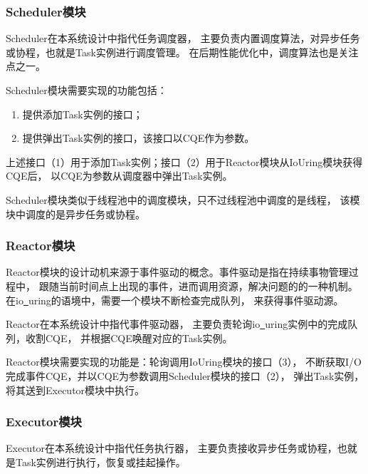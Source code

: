 \documentclass[supercite]{HustGraduPaper}
\theoremstyle{definition}
\begin{document}
\subsubsection{Scheduler模块}

Scheduler在本系统设计中指代任务调度器，
主要负责内置调度算法，对异步任务或协程，也就是Task实例进行调度管理。
在后期性能优化中，调度算法也是关注点之一。\par

Scheduler模块需要实现的功能包括：

\begin{enumerate}
  \item 提供添加Task实例的接口；
  \item 提供弹出Task实例的接口，该接口以CQE作为参数。
\end{enumerate}

上述接口（1）用于添加Task实例；接口（2）用于Reactor模块从IoUring模块获得CQE后，
以CQE为参数从调度器中弹出Task实例。\par

Scheduler模块类似于线程池中的调度模块，只不过线程池中调度的是线程，
该模块中调度的是异步任务或协程。\par

\subsubsection{Reactor模块}

Reactor模块的设计动机来源于事件驱动的概念。事件驱动是指在持续事物管理过程中，
跟随当前时间点上出现的事件，进而调用资源，解决问题的的一种机制。
在io\underline{~}uring的语境中，需要一个模块不断检查完成队列，
来获得事件驱动源。\par

Reactor在本系统设计中指代事件驱动器，
主要负责轮询io\underline{~}uring实例中的完成队列，收割CQE，
并根据CQE唤醒对应的Task实例。\par

Reactor模块需要实现的功能是：轮询调用IoUring模块的接口（3），
不断获取I/O完成事件CQE，并以CQE为参数调用Scheduler模块的接口（2），
弹出Task实例，将其送到Executor模块中执行。\par

\subsubsection{Executor模块}

Executor在本系统设计中指代任务执行器，
主要负责接收异步任务或协程，也就是Task实例进行执行，恢复或挂起操作。\par
\end{document}
